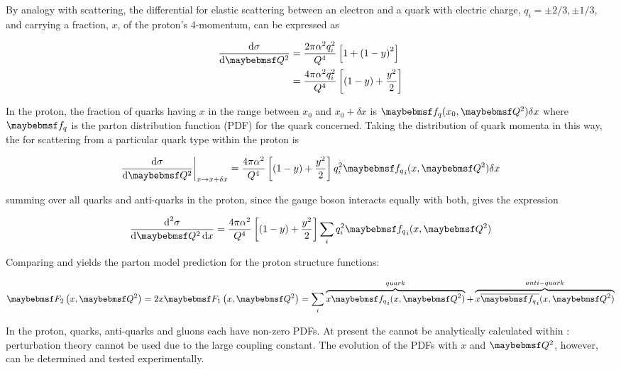By analogy with \emu scattering, the differential \xs for elastic scattering between an electron and a quark with electric charge, $q_i = \pm 2/3, \pm 1/3$, and carrying a fraction, $x$, of the proton's 4-momentum, can be expressed as

\begin{equation}
\begin{split}
  \dif{\sigma}{\Qsquared} &= \frac{2\pi\alpha^2q_i^2}{Q^4} \left[ 1 + \left(1 - y\right)^2 \right] \\
  &= \frac{4\pi\alpha^2q_i^2}{Q^4} \left[ (1 - y) + \frac{y^2}{2} \right]
  \label{eq:bg-theory:dsigmadQsquared}
\end{split}
\end{equation}

In the proton, the fraction of quarks having $x$ in the range between $x_0$ and $x_0+\delta x$ is $\PDFq(x_0, \Qsquared)\delta x$ where $\PDFq$ is the parton distribution function (PDF) for the quark concerned.
Taking the distribution of quark momenta in this way, the \xs for scattering from a particular quark type within the proton is

\begin{equation}
  \dif{\sigma}{\Qsquared} \bigg|_{x \rightarrow x + \delta x} = \frac{4\pi\alpha^2}{Q^4} \left[ (1 -  y) + \frac{y^2}{2} \right] q_i^2 \PDFq_i( x, \Qsquared ) \delta x
\end{equation}

\noindent summing over all quarks and anti-quarks in the proton, since the gauge boson interacts equally with both, gives the expression

\begin{equation}
  \difDouble{\sigma}{\Qsquared}{x} = \frac{4\pi\alpha^2}{Q^4} \left[ (1 -  y) + \frac{y^2}{2} \right] \sum_i q_i^2 \PDFq_i(x, \Qsquared)
  \label{eq:bg-theory:dsigmadQsquareddxPDFs}
\end{equation}

Comparing  and  yields the parton model prediction
for the proton structure functions:

\begin{equation}
  \F{2} = 2x\F{1} = \sum_i \overbrace{x\PDFq_i(x, \Qsquared)}^{quark} + \overbrace{x\overline{\PDFq_i}(x, \Qsquared)}^{anti-quark}
  \label{eq:bg-theory:F2}
\end{equation}

In the proton, quarks, anti-quarks and gluons each have non-zero PDFs.
At present the \PDFq cannot be analytically calculated within \QCD: perturbation theory cannot be used due to the large coupling constant. The evolution of the PDFs with $x$ and $\Qsquared$, however, can be determined and tested experimentally.

